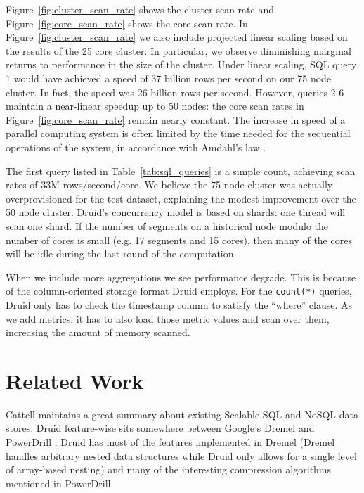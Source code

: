 \documentclass{vldb}
\begin{document}
Figure~\ref{fig:cluster_scan_rate} shows the cluster scan rate and
Figure~\ref{fig:core_scan_rate} shows the core scan rate.  In
Figure~\ref{fig:cluster_scan_rate} we also include projected linear
scaling based on the results of the 25 core cluster.  In particular,
we observe diminishing marginal returns to performance in the size of
the cluster.  Under linear scaling, SQL query 1 would have achieved a
speed of 37 billion rows per second on our 75 node cluster.  In fact,
the speed was 26 billion rows per second.  However, queries 2-6 maintain
a near-linear speedup up to 50 nodes: the core scan rates in
Figure~\ref{fig:core_scan_rate} remain nearly constant.
The increase in speed of a parallel
computing system is often limited by the time needed for the
sequential operations of the system, in accordance with Amdahl's law
\cite{amdahl1967validity}.

The first query listed in Table~\ref{tab:sql_queries} is a simple
count, achieving scan rates of 33M rows/second/core. We believe
the 75 node cluster was actually overprovisioned for the test
dataset, explaining the modest improvement over the 50 node cluster.
Druid's concurrency model is based on shards: one thread will scan one
shard. If the number of segments on a historical node modulo the number
of cores is small (e.g. 17 segments and 15 cores), then many of the
cores will be idle during the last round of the computation.

When we include more aggregations we see performance degrade.  This is
because of the column-oriented storage format Druid employs.  For the
\texttt{count(*)} queries, Druid only has to check the timestamp column to satisfy
the ``where'' clause.  As we add metrics, it has to also load those metric
values and scan over them, increasing the amount of memory scanned.

\section{Related Work}
\label{sec:related}
Cattell \cite{cattell2011scalable} maintains a great summary about existing Scalable SQL and
NoSQL data stores. Druid
feature-wise sits somewhere between Google’s Dremel \cite{melnik2010dremel} and PowerDrill
\cite{hall2012processing}. Druid has most of the features implemented in Dremel (Dremel
handles arbitrary nested data structures while Druid only allows for a
single level of array-based nesting) and many of the interesting
compression algorithms mentioned in PowerDrill.
\end{document}
